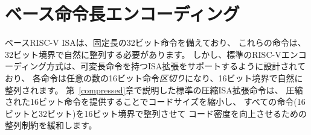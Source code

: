 \begin{comment}
\section{Base Instruction-Length Encoding}

The base RISC-V ISA has fixed-length 32-bit instructions that must be
naturally aligned on 32-bit boundaries.  However, the standard RISC-V
encoding scheme is designed to support ISA extensions with
variable-length instructions, where each instruction can be any number
of 16-bit instruction {\em parcels} in length and parcels are
naturally aligned on 16-bit boundaries.  The standard compressed ISA
extension described in Chapter~\ref{compressed} reduces code size by
providing compressed 16-bit instructions and relaxes the alignment
constraints to allow all instructions (16 bit and 32 bit) to be
aligned on any 16-bit boundary to improve code density.

We use the term IALIGN (measured in bits) to refer to the instruction-address
alignment constraint the implementation enforces.  IALIGN is 32 bits in the
base ISA, but some ISA extensions, including the compressed ISA extension,
relax IALIGN to 16 bits.  IALIGN may not take on any value other than 16 or
32.

We use the term ILEN (measured in bits) to refer to the maximum
instruction length supported by an implementation, and which is always
a multiple of IALIGN.  For implementations supporting only a base
instruction set, ILEN is 32 bits.  Implementations supporting longer
instructions have larger values of ILEN.

Figure~\ref{instlengthcode} illustrates the standard RISC-V
instruction-length encoding convention.  All the 32-bit instructions
in the base ISA have their lowest two bits set to {\tt 11}.  The
optional compressed 16-bit instruction-set extensions have their
lowest two bits equal to {\tt 00}, {\tt 01}, or {\tt 10}.
\end{comment}

\section{ベース命令長エンコーディング}

ベースRISC-V ISAは、固定長の32ビット命令を備えており、
これらの命令は、32ビット境界で自然に整列する必要があります。
しかし、標準のRISC-Vエンコーディング方式は、可変長命令を持つISA拡張をサポートするように設計されており、
各命令は任意の数の16ビット命令{\em 区切り}になり、16ビット境界で自然に整列されます。
第~\ref{compressed}章で説明した標準の圧縮ISA拡張命令は、
圧縮された16ビット命令を提供することでコードサイズを縮小し、
すべての命令(16ビットと32ビット)を16ビット境界で整列させて
コード密度を向上させるための整列制約を緩和します。

